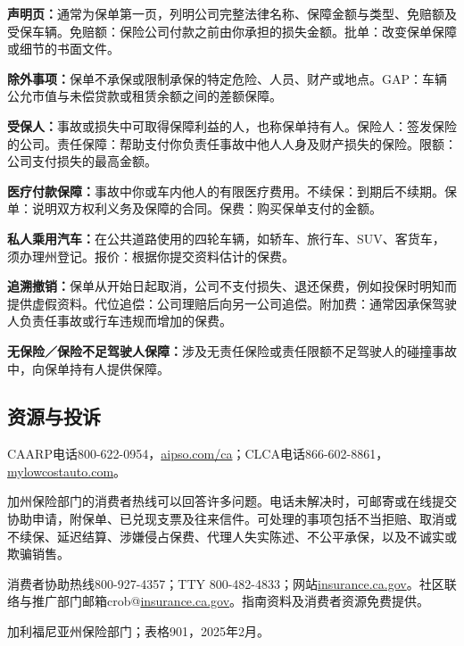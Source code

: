 \documentclass[UTF8,fontset=none,11pt,a4paper]{ctexart}
\begin{document}
\textbf{声明页：}通常为保单第一页，列明公司完整法律名称、保障金额与类型、免赔额及受保车辆。免赔额：保险公司付款之前由你承担的损失金额。批单：改变保单保障或细节的书面文件。


\textbf{除外事项：}保单不承保或限制承保的特定危险、人员、财产或地点。GAP：车辆公允市值与未偿贷款或租赁余额之间的差额保障。


\textbf{受保人：}事故或损失中可取得保障利益的人，也称保单持有人。保险人：签发保险的公司。责任保障：帮助支付你负责任事故中他人人身及财产损失的保险。限额：公司支付损失的最高金额。


\textbf{医疗付款保障：}事故中你或车内他人的有限医疗费用。不续保：到期后不续期。保单：说明双方权利义务及保障的合同。保费：购买保单支付的金额。


\textbf{私人乘用汽车：}在公共道路使用的四轮车辆，如轿车、旅行车、SUV、客货车，须办理州登记。报价：根据你提交资料估计的保费。


\textbf{追溯撤销：}保单从开始日起取消，公司不支付损失、退还保费，例如投保时明知而提供虚假资料。代位追偿：公司理赔后向另一公司追偿。附加费：通常因承保驾驶人负责任事故或行车违规而增加的保费。


\textbf{无保险／保险不足驾驶人保障：}涉及无责任保险或责任限额不足驾驶人的碰撞事故中，向保单持有人提供保障。


\subsection*{资源与投诉}
CAARP电话800-622-0954，\url{aipso.com/ca}；CLCA电话866-602-8861，\url{mylowcostauto.com}。


加州保险部门的消费者热线可以回答许多问题。电话未解决时，可邮寄或在线提交协助申请，附保单、已兑现支票及往来信件。可处理的事项包括不当拒赔、取消或不续保、延迟结算、涉嫌侵占保费、代理人失实陈述、不公平承保，以及不诚实或欺骗销售。


消费者协助热线800-927-4357；TTY 800-482-4833；网站\url{insurance.ca.gov}。社区联络与推广部门邮箱crob@\url{insurance.ca.gov}。指南资料及消费者资源免费提供。


加利福尼亚州保险部门；表格901，2025年2月。
\end{document}
